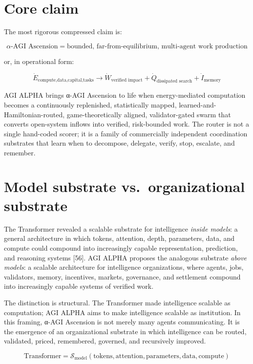 \documentclass[11pt]{article}
\begin{document}
\section{Core claim}\label{core-claim}

The most rigorous compressed claim is:

\[
\boxed{
\alpha\text{-AGI Ascension}
=
\text{bounded, far-from-equilibrium, multi-agent work production}
}
\]

or, in operational form:

\[
\boxed{
\dot{E}_{\text{compute,data,capital,tasks}}
\rightarrow
\dot{W}_{\text{verified impact}}
+
\dot{Q}_{\text{dissipated search}}
+
\dot{I}_{\text{memory}}
}
\]

AGI ALPHA brings α-AGI Ascension to life when energy-mediated
computation becomes a continuously replenished, statistically mapped,
learned-and-Hamiltonian-routed, game-theoretically aligned,
validator-gated swarm that converts open-system inflows into verified,
risk-bounded work. The router is not a single hand-coded scorer; it is a
family of commercially independent coordination substrates that learn
when to decompose, delegate, verify, stop, escalate, and remember.

\section{Model substrate vs.~organizational
substrate}\label{model-substrate-vs.-organizational-substrate}

The Transformer revealed a scalable substrate for intelligence
\emph{inside models}: a general architecture in which tokens, attention,
depth, parameters, data, and compute could compound into increasingly
capable representation, prediction, and reasoning systems {[}56{]}. AGI
ALPHA proposes the analogous substrate \emph{above models}: a scalable
architecture for intelligence organizations, where agents, jobs,
validators, memory, incentives, markets, governance, and settlement
compound into increasingly capable systems of verified work.

The distinction is structural. The Transformer made intelligence
scalable as computation; AGI ALPHA aims to make intelligence scalable as
institution. In this framing, α-AGI Ascension is not merely many agents
communicating. It is the emergence of an organizational substrate in
which intelligence can be routed, validated, priced, remembered,
governed, and recursively improved.

\[
\text{Transformer}=\mathcal{S}_{\text{model}}(\text{tokens},\text{attention},\text{parameters},\text{data},\text{compute})
\]
\end{document}
